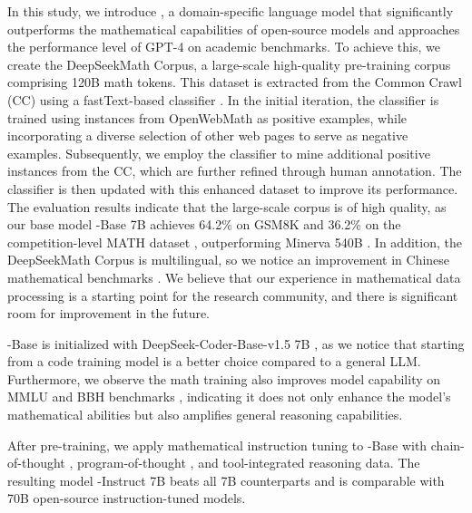 In this study, we introduce \spmath, a domain-specific language model that significantly outperforms the mathematical capabilities of open-source models and approaches the performance level of GPT-4 on academic benchmarks.
To achieve this, we create the DeepSeekMath Corpus, a large-scale high-quality pre-training corpus comprising 120B math tokens.
This dataset is extracted from the Common Crawl (CC) using a fastText-based classifier \citep{joulin2016fasttext}. In the initial iteration, the classifier is trained using instances from OpenWebMath \citep{openwebmath} as positive examples, while incorporating a diverse selection of other web pages to serve as negative examples. Subsequently, we employ the classifier to mine additional positive instances from the CC, which are further refined through human annotation. The classifier is then updated with this enhanced dataset to improve its performance. The evaluation results indicate that the large-scale corpus is of high quality, as our base model \spmath-Base 7B achieves 64.2\% on GSM8K \citep{gsm8k} and 36.2\% on the competition-level MATH dataset \citep{MATH}, outperforming Minerva 540B \citep{minerva}. In addition, the DeepSeekMath Corpus is multilingual, so we notice an improvement in Chinese mathematical benchmarks \citep{wei2023cmath,agieval}.
We believe that our experience in mathematical data processing is a starting point for the research community, and there is significant room for improvement in the future.

\spmath-Base is initialized with DeepSeek-Coder-Base-v1.5 7B \citep{deepseek-coder}, as we notice that starting from a code training model is a better choice compared to a general LLM. Furthermore, we observe the math training also improves model capability on MMLU \citep{mmlu} and BBH benchmarks \citep{bbh}, indicating it does not only enhance the model's mathematical abilities but also amplifies general reasoning capabilities.

After pre-training, we apply mathematical instruction tuning to \spmath-Base with chain-of-thought \citep{cot}, program-of-thought \citep{pot,pal}, and tool-integrated reasoning \citep{tora} data.
The resulting model \spmath-Instruct 7B beats all 7B counterparts and is comparable with 70B open-source instruction-tuned models.  

